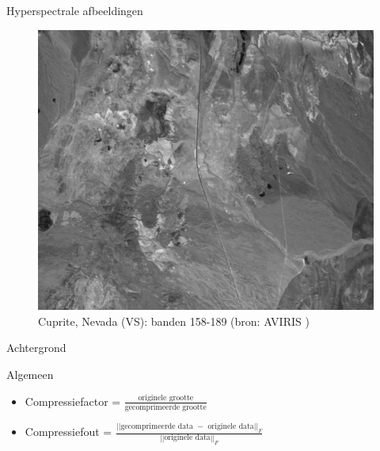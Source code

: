 \documentclass[t,12pt,dutch
\ifx\beamermode\undefined\else,\beamermode\fi
]{beamer}
\begin{document}
\begin{frame}{Hyperspectrale afbeeldingen}

\begin{figure}[H]
\centering
\includegraphics[scale=0.3]{images/cuprite_bands_158-190.png}
\caption{Cuprite, Nevada (VS): banden 158-189 (bron: AVIRIS \cite{ref:ehu_aviris_cuprite})}
\end{figure}

\end{frame}


\begin{frame}{}
\begin{center}
\vspace*{\fill}
\vspace*{\fill}
\Huge
Achtergrond
\normalsize
\vspace*{\fill}
\end{center}
\end{frame}

\begin{frame}{Algemeen}

\begin{itemize}
\item Compressiefactor = $\frac{\text{originele grootte}}{\text{gecomprimeerde grootte}}$
\item Compressiefout = $\frac{||\text{gecomprimeerde data } - \text{ originele data}||_F}{||\text{originele data}||_F}$
\end{itemize}

\end{frame}
\end{document}
